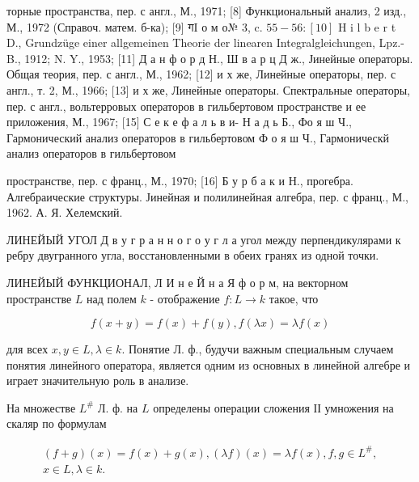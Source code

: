 \documentclass[10pt]{article}
\begin{document}
торные пространства, пер. с англ., М., 1971; [8] Функциональный анализ, 2 изд., М., 1972 (Справоч. матем. б-ка); [9] गI о м о№ 3, c. $55-56:[10]$ H i l b e r t D., Grundzüge einer allgemeinen Theorie der linearen Integralgleichungen, Lpz.- B., 1912; N. Y., 1953; [11] Д а н ф о р д Н., Ш в а р ц Д ж., Јинейные операторы. Общая теория, пер. с англ., М., 1962; [12] и х же, Линейные операторы, пер. с англ., т. 2, М., 1966; [13] и х же, Линейные операторы. Спектральные операторы, пер. с англ., вольтерровых операторов в гильбертовом пространстве и ее приложения, М., 1967; [15] С е к е ф а л ь в и- Н а д ь Б., Фо я ш Ч., Гармонический анализ операторов в гильбертовом Ф о я ш Ч., Гармоническй анализ операторов в гильбертовом

пространстве, пер. с франц., М., 1970; [16] Б у р б а к и Н., прогебра. Алгебраические структуры. Јинейная и полилинейная алгебра, пер. с франц., М., 1962. А. Я. Хелемский.



ЛИНЕЙЫЙ УГОЛ Д в у г р а н н о г о у г л а угол между перпендикулярами к ребру двугранного угла, восстановленными в обеих гранях из одной точки.



ЛИНЕЙЫЙ ФУНКЦИОНАЛ, Л И н е Й н а Я ф о р м, на векторном пространстве $L$ над полем $k$ - отображение $f: L \rightarrow k$ такое, что



\[

f(x+y)=f(x)+f(y), f(\lambda x)=\lambda f(x)

\]



для всех $x, y \in L, \lambda \in k$. Понятие Л. ф., будучи важным специальным случаем понятия линейного оператора, является одним из основных в линейной алгебре и играет значительную роль в анализе.



На множестве $L^{\#}$ Л. ф. на $L$ определены операции сложения ІІ умножения на скаляр по формулам



\[

\begin{gathered}

(f+g)(x)=f(x)+g(x),(\lambda f)(x)=\lambda f(x), f, g \in L^{\#}, \\

x \in L, \lambda \in k .

\end{gathered}

\]
\end{document}
